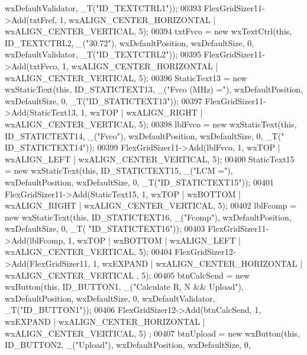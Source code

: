\begin{DoxyCode}
      wxDefaultValidator, \_T(\textcolor{stringliteral}{"ID\_TEXTCTRL1"}));
00393     FlexGridSizer11->Add(txtFref, 1, wxALIGN\_CENTER\_HORIZONTAL | wxALIGN\_CENTER\_VERTICAL, 5);
00394     txtFvco = \textcolor{keyword}{new} wxTextCtrl(\textcolor{keyword}{this}, ID\_TEXTCTRL2, \_(\textcolor{stringliteral}{"30.72"}), wxDefaultPosition, wxDefaultSize, 0, 
      wxDefaultValidator, \_T(\textcolor{stringliteral}{"ID\_TEXTCTRL2"}));
00395     FlexGridSizer11->Add(txtFvco, 1, wxALIGN\_CENTER\_HORIZONTAL | wxALIGN\_CENTER\_VERTICAL, 5);
00396     StaticText13 = \textcolor{keyword}{new} wxStaticText(\textcolor{keyword}{this}, ID\_STATICTEXT13, \_(\textcolor{stringliteral}{"Fvco (MHz) ="}), wxDefaultPosition, 
      wxDefaultSize, 0, \_T(\textcolor{stringliteral}{"ID\_STATICTEXT13"}));
00397     FlexGridSizer11->Add(StaticText13, 1, wxTOP | wxALIGN\_RIGHT | wxALIGN\_CENTER\_VERTICAL, 5);
00398     lblFvco = \textcolor{keyword}{new} wxStaticText(\textcolor{keyword}{this}, ID\_STATICTEXT14, \_(\textcolor{stringliteral}{"Fvco"}), wxDefaultPosition, wxDefaultSize, 0, \_T(\textcolor{stringliteral}{"
      ID\_STATICTEXT14"}));
00399     FlexGridSizer11->Add(lblFvco, 1, wxTOP | wxALIGN\_LEFT | wxALIGN\_CENTER\_VERTICAL, 5);
00400     StaticText15 = \textcolor{keyword}{new} wxStaticText(\textcolor{keyword}{this}, ID\_STATICTEXT15, \_(\textcolor{stringliteral}{"LCM ="}), wxDefaultPosition, wxDefaultSize, 0,
       \_T(\textcolor{stringliteral}{"ID\_STATICTEXT15"}));
00401     FlexGridSizer11->Add(StaticText15, 1, wxTOP | wxBOTTOM | wxALIGN\_RIGHT | wxALIGN\_CENTER\_VERTICAL, 5);
00402     lblFcomp = \textcolor{keyword}{new} wxStaticText(\textcolor{keyword}{this}, ID\_STATICTEXT16, \_(\textcolor{stringliteral}{"Fcomp"}), wxDefaultPosition, wxDefaultSize, 0, \_T(\textcolor{stringliteral}{
      "ID\_STATICTEXT16"}));
00403     FlexGridSizer11->Add(lblFcomp, 1, wxTOP | wxBOTTOM | wxALIGN\_LEFT | wxALIGN\_CENTER\_VERTICAL, 5);
00404     FlexGridSizer12->Add(FlexGridSizer11, 1, wxEXPAND | wxALIGN\_CENTER\_HORIZONTAL | wxALIGN\_CENTER\_VERTICAL
      , 5);
00405     btnCalcSend = \textcolor{keyword}{new} wxButton(\textcolor{keyword}{this}, ID\_BUTTON1, \_(\textcolor{stringliteral}{"Calculate R, N && Upload"}), wxDefaultPosition, 
      wxDefaultSize, 0, wxDefaultValidator, \_T(\textcolor{stringliteral}{"ID\_BUTTON1"}));
00406     FlexGridSizer12->Add(btnCalcSend, 1, wxEXPAND | wxALIGN\_CENTER\_HORIZONTAL | wxALIGN\_CENTER\_VERTICAL, 5)
      ;
00407     btnUpload = \textcolor{keyword}{new} wxButton(\textcolor{keyword}{this}, ID\_BUTTON2, \_(\textcolor{stringliteral}{"Upload"}), wxDefaultPosition, wxDefaultSize, 0, 

\end{DoxyCode}
